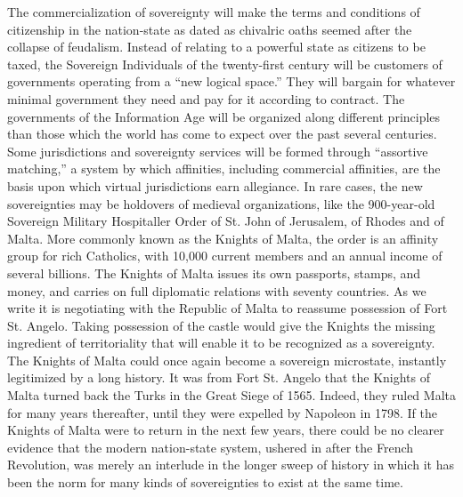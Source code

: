 \begin{Parallel}{97mm}{45mm}
  \ParallelLText
  {The commercialization of sovereignty will make the terms and conditions of citizenship in the nation-state as dated as chivalric oaths seemed after the collapse of feudalism. Instead of relating to a powerful state as citizens to be taxed, the Sovereign Individuals of the twenty-first century will be customers of governments operating from a “new logical space.” They will bargain for whatever minimal government they need and pay for it according to contract. The governments of the Information Age will be organized along different principles than those which the world has come to expect over the past several centuries. Some jurisdictions and sovereignty services will be formed through “assortive matching,” a system by which affinities, including commercial affinities, are the basis upon which virtual jurisdictions earn allegiance. In rare cases, the new sovereignties may be holdovers of medieval organizations, like the 900-year-old Sovereign Military Hospitaller Order of St. John of Jerusalem, of Rhodes and of Malta. More commonly known as the Knights of Malta, the order is an affinity group for rich Catholics, with 10,000 current members and an annual income of several billions. The Knights of Malta issues its own passports, stamps, and money, and carries on full diplomatic relations with seventy countries. As we write it is negotiating with the Republic of Malta to reassume possession of Fort St. Angelo. Taking possession of the castle would give the Knights the missing ingredient of territoriality that will enable it to be recognized as a sovereignty. The Knights of Malta could once again become a sovereign microstate, instantly legitimized by a long history. It was from Fort St. Angelo that the Knights of Malta turned back the Turks in the Great Siege of 1565. Indeed, they ruled Malta for many years thereafter, until they were expelled by Napoleon in 1798. If the Knights of Malta were to return in the next few years, there could be no clearer evidence that the modern nation-state system, ushered in after the French Revolution, was merely an interlude in the longer sweep of history in which it has been the norm for many kinds of sovereignties to exist at the same time. }
  

\end{Parallel}
